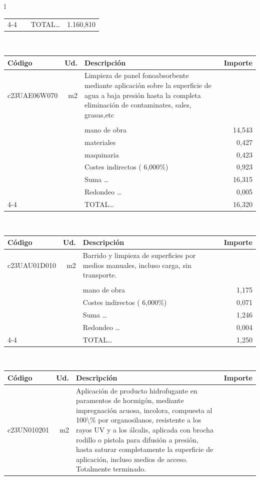 \documentclass{book}%
\begin{document}
\begin{longtable}{l}
\begin{tabular}{l r p{60mm} r}
\cline{4-4}%
&&TOTAL\ldots& 1.160,810\\%
\end{tabular}\\%
\begin{tabular}{l r p{60mm} r}%
Código&Ud.&Descripción&Importe\\%
\hline%
c23UAE06W070&m2&Limpieza de panel fonoabsorbente mediante aplicación sobre la superficie de agua a baja presión hasta la completa eliminación de contaminates, sales, grasas,etc &\\%
&&&\\%
&&mano de obra&    14,543\\%
&&materiales&     0,427\\%
&&maquinaria&     0,423\\%
&&Costes indirectos (     6,000\%)&     0,923\\%
&&Suma \ldots&    16,315\\%
&&Redondeo \ldots&     0,005\\%
\cline{4-4}%
&&TOTAL\ldots&    16,320\\%
\end{tabular}\\%
\begin{tabular}{l r p{60mm} r}%
Código&Ud.&Descripción&Importe\\%
\hline%
c23UAU01D010&m2&Barrido y limpieza de superficies por medios manuales, incluso carga, sin transporte.&\\%
&&&\\%
&&mano de obra&     1,175\\%
&&Costes indirectos (     6,000\%)&     0,071\\%
&&Suma \ldots&     1,246\\%
&&Redondeo \ldots&     0,004\\%
\cline{4-4}%
&&TOTAL\ldots&     1,250\\%
\end{tabular}\\%
\begin{tabular}{l r p{60mm} r}%
Código&Ud.&Descripción&Importe\\%
\hline%
c23UN010201&m2&Aplicación de producto hidrofugante en paramentos de hormigón, mediante impregnación acuosa, incolora, compuesta al 100\textbackslash{}\% por organosilanos, resistente a los rayos UV y a los álcalis, aplicada con brocha rodillo o pistola para difusión a presión, hasta saturar completamente la superficie de aplicación, incluso medios de acceso. Totalmente terminado.&\\%

\end{tabular}
\end{longtable}
\end{document}
